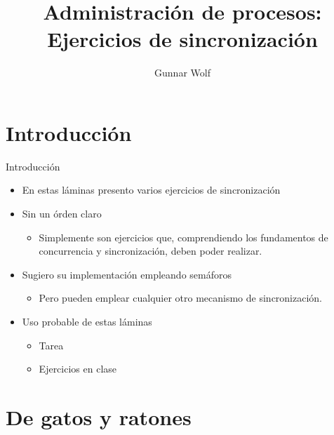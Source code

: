 \documentclass[presentation]{beamer}
\author{Gunnar Wolf}
\date{}
\title{Administración de procesos: Ejercicios de sincronización}
\begin{document}
\maketitle

\section{Introducción}
\label{sec:org2b1dd9e}

\begin{frame}[label={sec:orgd3d6c0a}]{Introducción}
\begin{itemize}
\item En estas láminas presento varios ejercicios de sincronización
\item Sin un órden claro
\begin{itemize}
\item Simplemente son ejercicios que, comprendiendo los fundamentos de
concurrencia y sincronización, deben poder realizar.
\end{itemize}
\item Sugiero su implementación empleando semáforos
\begin{itemize}
\item Pero pueden emplear cualquier otro mecanismo de sincronización.
\end{itemize}
\item Uso probable de estas láminas
\begin{itemize}
\item Tarea
\item Ejercicios en clase
\end{itemize}
\end{itemize}
\end{frame}

\section{De gatos y ratones}
\label{sec:orgc48bf05}
\end{document}
